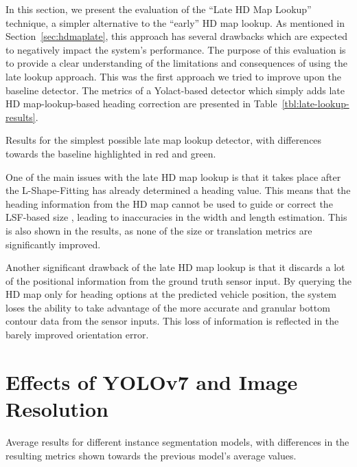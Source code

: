In this section, we present the evaluation of the \enquote{Late HD Map Lookup} technique, a simpler alternative to the \enquote{early} HD map lookup.
As mentioned in Section~\ref{sec:hdmaplate}, this approach has several drawbacks which are expected to negatively impact the system's performance.
The purpose of this evaluation is to provide a clear understanding of the limitations and consequences of using the late lookup approach.
This was the first approach we tried to improve upon the baseline detector.
The metrics of a Yolact-based detector which simply adds late HD map-lookup-based heading correction are presented in Table~\ref{tbl:late-lookup-results}.

\begin{table}[htbp]
    
    \caption{Results for the simplest possible late map lookup detector, with differences towards the baseline highlighted in red and green.}
    \label{tbl:late-lookup-results}
\end{table}

One of the main issues with the late HD map lookup is that it takes place after the L-Shape-Fitting has already determined a heading value.
This means that the heading information from the HD map cannot be used to guide or correct the LSF-based size , leading to inaccuracies in the width and length estimation.
This is also shown in the results, as none of the size or translation metrics are significantly improved.

Another significant drawback of the late HD map lookup is that it discards a lot of the positional information from the ground truth sensor input.
By querying the HD map only for heading options at the predicted vehicle position, the system loses the ability to take advantage of the more accurate and granular bottom contour data from the sensor inputs.
This loss of information is reflected in the barely improved orientation error.


\section{Effects of YOLOv7 and Image Resolution}
\label{sec:impactyolov7}

\begin{table}[htbp]
    
    \caption{Average results for different instance segmentation models, with differences in the resulting metrics shown towards the previous model's average values.}
    \label{tbl:resolution-results}
\end{table}

